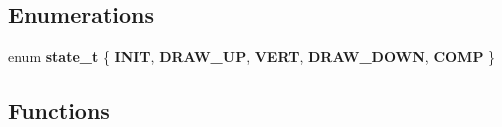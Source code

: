 \subsection*{Enumerations}
\begin{DoxyCompactItemize}
\item 
\mbox{\label{group__Mouse_gaa0aafed44fec19806d8f9ad834be1248}} 
enum {\bfseries state\+\_\+t} \{ \newline
{\bfseries I\+N\+IT}, 
{\bfseries D\+R\+A\+W\+\_\+\+UP}, 
{\bfseries V\+E\+RT}, 
{\bfseries D\+R\+A\+W\+\_\+\+D\+O\+WN}, 
\newline
{\bfseries C\+O\+MP}
 \}
\end{DoxyCompactItemize}
\subsection*{Functions}
